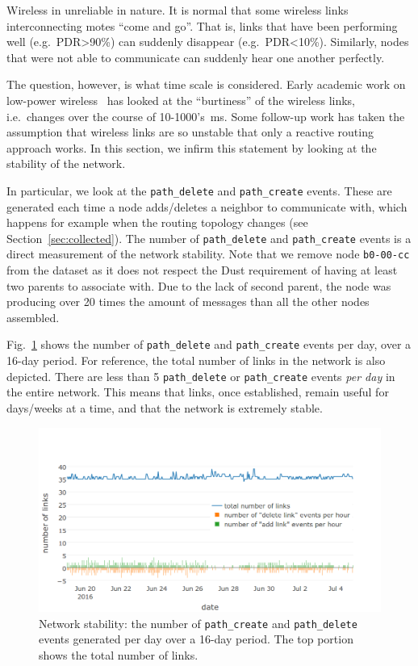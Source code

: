\documentclass{sig-alternate}
\newcommand{\pathcreate}          {{\tt path\_create}\xspace}
\newcommand{\pathdelete}          {{\tt path\_delete}\xspace}
\begin{document}

Wireless in unreliable in nature.
It is normal that some wireless links interconnecting motes ``come and go''.
That is, links that have been performing well (e.g.~PDR>90\%) can suddenly disappear (e.g.~PDR<10\%).
Similarly, nodes that were not able to communicate can suddenly hear one another perfectly.


The question, however, is what time scale is considered.
Early academic work on low-power wireless~\cite{srinivasan08beta} has looked at the ``burtiness'' of the wireless links, i.e.~changes over the course of 10-1000's~ms.
Some follow-up work has taken the assumption that wireless links are so unstable that only a reactive routing approach works.
In this section, we infirm this statement by looking at the stability of the network.


In particular, we look at the \pathdelete and \pathcreate events.
These are generated each time a node adds/deletes a neighbor to communicate with, which happens for example when the routing topology changes (see Section~\ref{sec:collected}).
The number of \pathdelete and \pathcreate events is a direct measurement of the network stability.
Note that we remove node {\tt b0-00-cc} from the dataset as it does not respect the Dust requirement of having at least two parents to associate with.
Due to the lack of second parent, the node was producing over 20 times the amount of messages than all the other nodes assembled.


Fig.~\ref{fig:net_churn} shows the number of \pathdelete and \pathcreate events per day, over a 16-day period.
For reference, the total number of links in the network is also depicted.
There are less than 5 \pathdelete or \pathcreate events \textit{per day} in the entire network.
This means that links, once established, remain useful for days/weeks at a time, and that the network is extremely stable.

\begin{figure}
    \centering
    \includegraphics[width=\columnwidth]{net_churn}
    \caption{
        Network stability: the number of \pathcreate and \pathdelete events generated per day over a 16-day period.
        The top portion shows the total number of links.
    }
    \label{fig:net_churn}
\end{figure}
\end{document}

